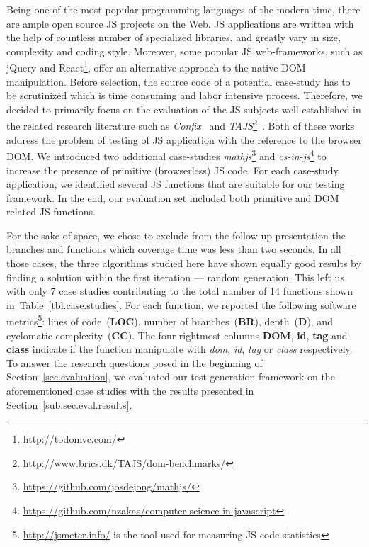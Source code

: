 \documentclass[sigconf,review,anonymous]{acmart}
\begin{document}
Being one of the most popular programming languages of the modern time, there are ample open source JS projects on the Web. JS applications are written with the help of countless number of specialized libraries, and greatly vary in size, complexity and coding style. Moreover, some popular JS web-frameworks, such as jQuery and React\footnote{\url{http://todomvc.com/}}, offer an alternative approach to the native DOM manipulation. Before selection, the source code of a potential case-study has to be scrutinized which is time consuming and labor intensive process. Therefore, we decided to primarily focus on the evaluation of the JS subjects well-established in the related research literature such as \emph{Confix}~\cite{amin:ase15} and \emph{TAJS}\footnote{\url{http://www.brics.dk/TAJS/dom-benchmarks/}}~\cite{dom2011}. Both of these works address the problem of testing of JS application with the reference to the browser DOM. We introduced two additional case-studies \emph{mathjs}\footnote{\url{https://github.com/josdejong/mathjs/}} and \emph{cs-in-js}\footnote{\url{https://github.com/nzakas/computer-science-in-javascript}} to increase the presence of primitive (browserless) JS code. For each case-study application, we identified several JS functions that are suitable for our testing framework. In the end, our evaluation set included both primitive and DOM related JS functions.

For the sake of space, we chose to exclude from the follow up presentation the branches and functions which coverage time was less than two seconds. In all those cases, the three algorithms studied here have shown equally good results by finding a solution within the first iteration --- random generation. This left us with only 7 case studies contributing to the total number of 14 functions  shown in~Table~\ref{tbl.case.studies}. For each function, we reported the following software metrics\footnote{\url{http://jsmeter.info/} is the tool used for measuring JS code statistics}: lines of code~(\textbf{LOC}), number of branches~(\textbf{BR}), depth~(\textbf{D}), and cyclomatic complexity~(\textbf{CC}). The four rightmost columns \textbf{DOM}, \textbf{id}, \textbf{tag} and \textbf{class} indicate if the function manipulate with \emph{dom}, \emph{id}, \emph{tag} or \emph{class} respectively. To answer the research questions posed in the beginning of Section~\ref{sec.evaluation}, we evaluated our test generation framework on the aforementioned case studies with the results presented in Section~\ref{sub.sec.eval.results}.
 
\end{document}
